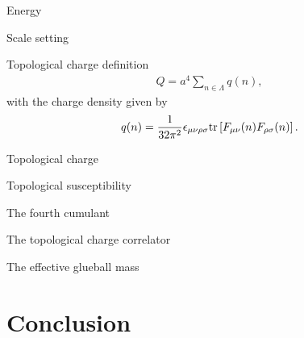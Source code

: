 \documentclass[10pt,show notes on second screen]{beamer}
\begin{document}
\begin{frame}{Energy}
\end{frame}

\begin{frame}{Scale setting}
\end{frame}

\begin{frame}{Topological charge definition}
\begin{align*}
    Q = a^4 \sum_{n\in\Lambda} q(n),
\end{align*}
with the charge density given by
\begin{align*}
    q(n) = \frac{1}{32\pi^2} \epsilon_{\mu\nu\rho\sigma} \mathrm{tr}\left[F_{\mu\nu}(n)F_{\rho\sigma}(n)\right].
\end{align*}
\end{frame}

\begin{frame}{Topological charge}
\end{frame}

\begin{frame}{Topological susceptibility}
\end{frame}

\begin{frame}{The fourth cumulant}
\end{frame}

\begin{frame}{The topological charge correlator}
\end{frame}

\begin{frame}{The effective glueball mass}
\end{frame}

\section{Conclusion}
\begin{frame}
\end{frame}
\end{document}

